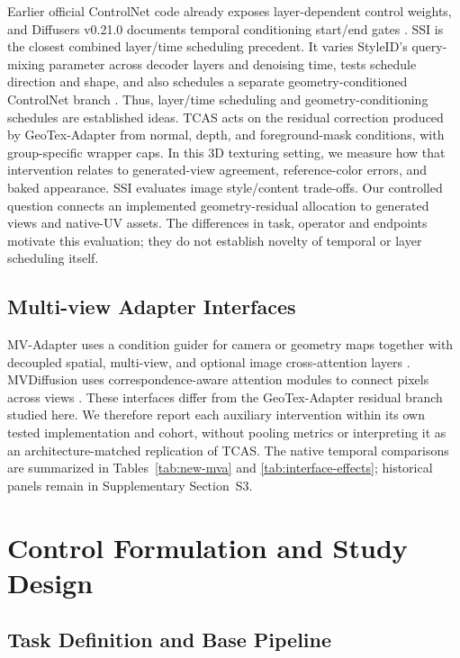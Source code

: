 \documentclass[times,twocolumn,final]{elsarticle}
\begin{document}
Earlier official ControlNet code already exposes layer-dependent control weights, and Diffusers v0.21.0 documents temporal conditioning start/end gates \cite{controlnet2023layercontrol,diffusers2023controlnet}. SSI is the closest combined layer/time scheduling precedent. It varies StyleID's query-mixing parameter \cite{chung2024styleid} across decoder layers and denoising time, tests schedule direction and shape, and also schedules a separate geometry-conditioned ControlNet branch \cite{kulkarni2026ssi}. Thus, layer/time scheduling and geometry-conditioning schedules are established ideas. TCAS acts on the residual correction produced by GeoTex-Adapter from normal, depth, and foreground-mask conditions, with group-specific wrapper caps. In this 3D texturing setting, we measure how that intervention relates to generated-view agreement, reference-color errors, and baked appearance. SSI evaluates image style/content trade-offs. Our controlled question connects an implemented geometry-residual allocation to generated views and native-UV assets. The differences in task, operator and endpoints motivate this evaluation; they do not establish novelty of temporal or layer scheduling itself.

\subsection{Multi-view Adapter Interfaces}
\label{subsec:mvinterfaces}

MV-Adapter uses a condition guider for camera or geometry maps together with decoupled spatial, multi-view, and optional image cross-attention layers \cite{huang2024mvadapter}. MVDiffusion uses correspondence-aware attention modules to connect pixels across views \cite{tang2023mvdiffusion}. These interfaces differ from the GeoTex-Adapter residual branch studied here. We therefore report each auxiliary intervention within its own tested implementation and cohort, without pooling metrics or interpreting it as an architecture-matched replication of TCAS. The native temporal comparisons are summarized in Tables~\ref{tab:new-mva} and \ref{tab:interface-effects}; historical panels remain in Supplementary Section~S3.

\section{Control Formulation and Study Design}
\label{sec:method}

\subsection{Task Definition and Base Pipeline}
\label{subsec:task}
\end{document}
